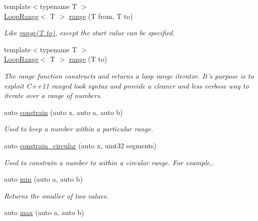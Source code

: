 \begin{DoxyCompactItemize}
\item 
{\footnotesize template$<$typename T $>$ }\\\hyperlink{classetk_1_1_loop_range}{Loop\-Range}$<$ T $>$ \hyperlink{namespaceetk_aff39b0f367ee4d947e2e7d297ffd506b}{range} (T from, T to)
\begin{DoxyCompactList}\small\item\em Like \hyperlink{namespaceetk_a65f1ea4495206c62f285e48ffd2f677e}{range(\-T to)}, except the start value can be specified. \end{DoxyCompactList}\item 
{\footnotesize template$<$typename T $>$ }\\\hyperlink{classetk_1_1_loop_range}{Loop\-Range}$<$ T $>$ \hyperlink{namespaceetk_a65f1ea4495206c62f285e48ffd2f677e}{range} (T to)
\begin{DoxyCompactList}\small\item\em The range function constructs and returns a loop range iterator. It's purpose is to exploit C++11 ranged look syntax and provide a cleaner and less verbose way to iterate over a range of numbers. \end{DoxyCompactList}\item 
auto \hyperlink{namespaceetk_a3b8ba4e0ed638ad07a7ab4f6cfc22c26}{constrain} (auto x, auto a, auto b)
\begin{DoxyCompactList}\small\item\em Used to keep a number within a particular range. \end{DoxyCompactList}\item 
auto \hyperlink{namespaceetk_a77f395cb44512ab4a95d08b01b3c7f20}{constrain\-\_\-circular} (auto x, uint32 segments)
\begin{DoxyCompactList}\small\item\em Used to constrain a number to within a circular range. For example,. \end{DoxyCompactList}\item 
\hypertarget{namespaceetk_a6643ab662d2d880d937a8adfea183ac6}{auto \hyperlink{namespaceetk_a6643ab662d2d880d937a8adfea183ac6}{min} (auto a, auto b)}\label{namespaceetk_a6643ab662d2d880d937a8adfea183ac6}

\begin{DoxyCompactList}\small\item\em Returns the smaller of two values. \end{DoxyCompactList}\item 
\hypertarget{namespaceetk_a0b90340a93fcebfc57cb7c5f30bed26d}{auto \hyperlink{namespaceetk_a0b90340a93fcebfc57cb7c5f30bed26d}{max} (auto a, auto b)}\label{namespaceetk_a0b90340a93fcebfc57cb7c5f30bed26d}


\end{DoxyCompactItemize}
